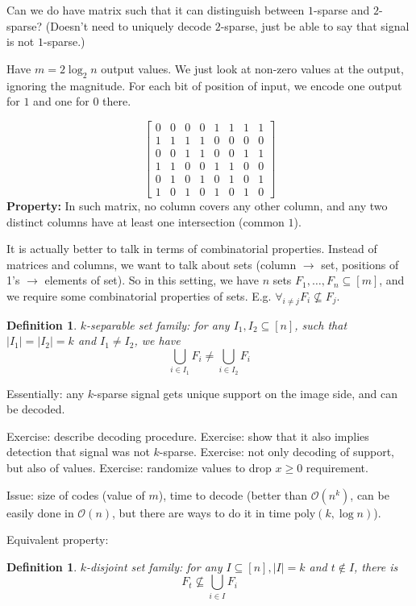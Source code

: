 \documentclass[11pt]{article}
\newtheorem{definition}[theorem]{Definition}
\newcommand{\bigo}{\mathcal{O}}
\begin{document}
Can we do have matrix such that it can distinguish between $1$-sparse and $2$-sparse? (Doesn't need to uniquely decode $2$-sparse, just be able to say that signal is not $1$-sparse.)

Have $m = 2 \log_2 n$ output values. We just look at non-zero values at the output, ignoring the magnitude. For each bit of position of input, we encode one output for $1$ and one for $0$ there.

$$\begin{bmatrix} 0 & 0 & 0 & 0 & 1 & 1 & 1 & 1 \\ 1 & 1 & 1 & 1 &  0 & 0 & 0 & 0 \\  0 & 0 & 1 & 1 & 0 & 0 & 1 & 1 \\ 1 & 1 & 0 & 0 & 1 & 1 & 0 & 0  \\ 0 & 1 & 0 & 1 & 0 & 1 & 0 & 1 \\ 1 & 0 & 1 & 0 & 1 & 0 & 1 & 0 \end{bmatrix}
$$
\textbf{Property:} In such matrix, no column covers any other column, and any two distinct columns have at least one intersection (common $1$).


It is actually better to talk in terms of combinatorial properties. Instead of matrices and columns, we want to talk about sets (column $\to$ set, positions of 1's $\to$ elements of set).
So in this setting, we have $n$ sets $F_1,\ldots,F_n \subseteq [m]$, and we require some combinatorial properties of sets. E.g. $\forall_{i\not=j} F_i \not\subseteq F_j$.

\begin{definition}
$k$-separable set family: for any $I_1,I_2 \subseteq [n]$, such that $|I_1| = |I_2| = k$ and $I_1 \not= I_2$, we have
$$ \bigcup_{i \in I_1} F_i \not= \bigcup_{i \in I_2} F_i$$
\end{definition}

Essentially: any $k$-sparse signal gets unique support on the image side, and can be decoded.

Exercise: describe decoding procedure. Exercise: show that it also implies detection that signal was not $k$-sparse. Exercise: not only decoding of support, but also of values. Exercise: randomize values to drop $x \ge 0$ requirement.

Issue: size of codes (value of $m$), time to decode (better than $\bigo(n^k)$, can be easily done in $\bigo(n)$, but there are ways to do it in time $\textrm{poly}(k,\log n)$).

Equivalent property: 
\begin{definition}
$k$-disjoint set family:
for any $I \subseteq [n], |I| = k$ and $t \not\in I$, there is 
$$F_t \not\subseteq \bigcup_{i \in I} F_i$$
\end{definition}
\end{document}
